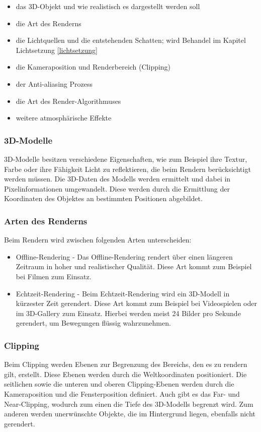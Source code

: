 \begin{itemize}
    \item das 3D-Objekt und wie realistisch es dargestellt werden soll
    \item die Art des Renderns
    \item die Lichtquellen und die entstehenden Schatten; wird Behandel im Kapitel Lichtsetzung \ref{lichtsetzung}
    \item die Kameraposition und Renderbereich (Clipping)
    \item der Anti-aliasing Prozess
    \item die Art des Render-Algorithmuses
    \item weitere atmosphärische Effekte 
    
    
\end{itemize}
\cite{Rendering3DModels}

\subsubsection{3D-Modelle}
3D-Modelle besitzen verschiedene Eigenschaften, wie zum Beispiel ihre Textur, Farbe oder ihre Fähigkeit Licht zu reflektieren, die beim Rendern berücksichtigt werden müssen. Die 3D-Daten des Modells werden ermittelt und dabei in Pixelinformationen umgewandelt. Diese werden durch die Ermittlung der Koordinaten des Objektes an bestimmten Positionen abgebildet. \cite{Rendering3DModels}

\subsubsection{Arten des Renderns}
Beim Rendern wird zwischen folgenden Arten unterscheiden:

\begin{itemize}
    \item Offline-Rendering - Das Offline-Rendering rendert über einen längeren Zeitraum in hoher und realistischer Qualität. Diese Art kommt zum Beispiel bei Filmen zum Einsatz. 
    \item Echtzeit-Rendering - Beim Echtzeit-Rendering wird ein 3D-Modell in kürzester Zeit gerendert. Diese Art kommt zum Beispiel bei Videospielen oder im 3D-Gallery zum Einsatz. Hierbei werden meist 24 Bilder pro Sekunde gerendert, um Bewegungen flüssig wahrzunehmen. 
\end{itemize}
\cite{RenderArten}

\subsubsection{Clipping}
\label{clipping}
Beim Clipping werden Ebenen zur Begrenzung des Bereichs, den es zu rendern gilt, erstellt. Diese Ebenen werden durch die Weltkoordinaten positioniert. Die seitlichen sowie die unteren und oberen Clipping-Ebenen werden durch die Kameraposition und die Fensterposition definiert. Auch gibt es das Far- und Near-Clipping, wodurch zum einen die Tiefe des 3D-Modells begrenzt wird. Zum anderen werden unerwünschte Objekte, die im Hintergrund liegen, ebenfalls nicht gerendert. \cite{Rendering3DModels}


